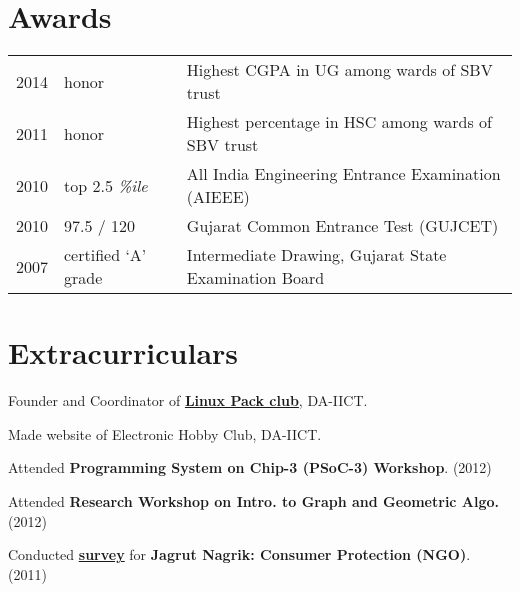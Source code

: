 \documentclass[]{deedy}
\begin{document}
\begin{minipage}[t]{0.66\textwidth}

\section{Awards}
\begin{tabular}{rll}
2014 & honor & Highest CGPA in UG among wards of SBV trust\\
2011 & honor & Highest percentage in HSC among wards of SBV trust\\
2010 & top 2.5 \textit{\%ile} & All India Engineering Entrance Examination (AIEEE)\\
2010 & 97.5 / 120 & Gujarat Common Entrance Test (GUJCET)\\
2007 & certified `A' grade & Intermediate Drawing, Gujarat State Examination Board\\
\end{tabular}

\section{Extracurriculars} 
\vspace{\topsep} %
\begin{tightemize}
\item Founder and Coordinator of  \href{http://lpdaiict.wordpress.com/}{\textbf{Linux Pack club}}, DA-IICT.
\item Made website of Electronic Hobby Club, DA-IICT.
\item Attended \textbf{Programming System on Chip-3 (PSoC-3) Workshop}. (2012)
\item Attended \textbf{Research Workshop on Intro. to Graph and Geometric Algo.} (2012)
\item Conducted \href{https://dl.dropboxusercontent.com/u/9020146/resources/reports/rural_internship.pdf}{\textbf{survey}} for \textbf{Jagrut Nagrik: Consumer Protection (NGO)}. (2011)
\end{tightemize}

\end{minipage} 
\end{document}
